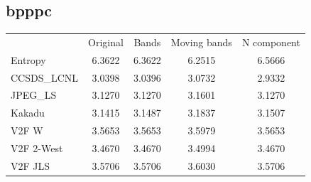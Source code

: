 \documentclass{article}
\begin{document}
\subsection*{bpppc}
\begin{table}[h]
\begin{tabular}{lcccc}
\rowcolor[HTML]{C0C0C0} 
 & Original & Bands & Moving bands & N component \\
\cellcolor[HTML]{C0C0C0}Entropy & \cellcolor[HTML]{E0E0E0}6.3622 &  \cellcolor[HTML]{E0E0E0}6.3622 &  \cellcolor[HTML]{E0E0E0}6.2515 &  \cellcolor[HTML]{E0E0E0} 6.5666\\ 
\cellcolor[HTML]{C0C0C0}CCSDS\_LCNL & 3.0398 & 3.0396 & 3.0732 & \cellcolor[HTML]{DAE8FC} 2.9332\\
\cellcolor[HTML]{C0C0C0}JPEG\_LS    & \cellcolor[HTML]{DAE8FC}3.1270 & \cellcolor[HTML]{DAE8FC}3.1270 & 3.1601 & \cellcolor[HTML]{DAE8FC}3.1270 \\
\cellcolor[HTML]{C0C0C0}Kakadu      & \cellcolor[HTML]{DAE8FC}3.1415 & 3.1487 & 3.1837 & 3.1507\\
\cellcolor[HTML]{C0C0C0}V2F W       & \cellcolor[HTML]{DAE8FC}3.5653 & \cellcolor[HTML]{DAE8FC}3.5653 & 3.5979 & \cellcolor[HTML]{DAE8FC}3.5653\\
\cellcolor[HTML]{C0C0C0}V2F 2-West  & \cellcolor[HTML]{DAE8FC}3.4670 & \cellcolor[HTML]{DAE8FC}3.4670 & 3.4994 & \cellcolor[HTML]{DAE8FC}3.4670\\
\cellcolor[HTML]{C0C0C0}V2F JLS     & \cellcolor[HTML]{DAE8FC}3.5706 & \cellcolor[HTML]{DAE8FC}3.5706 & 3.6030 & \cellcolor[HTML]{DAE8FC}3.5706\\
\end{tabular}
\end{table}
\end{document}
